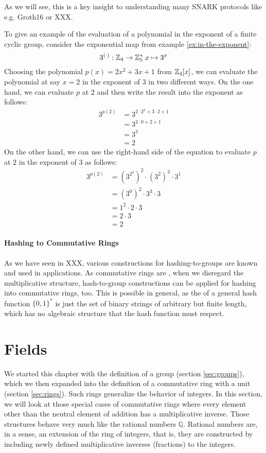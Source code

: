 As we will see, this is a key insight to understanding many SNARK protocols like e.g. Groth16 \citep{Groth16} or XXX.
\begin{example} To give an example of the evaluation of a polynomial in the exponent of a finite cyclic group, consider the exponential map from example \ref{ex:in-the-exponent}:
$$
3^{(\cdot)}: \mathbb{Z}_4 \to \mathbb{Z}_5^* \; x \mapsto 3^x
$$
 Choosing the polynomial $p(x)= 2x^2 +3x +1$ from $\mathbb{Z}_4[x]$, we can evaluate the polynomial at say $x=2$ in the exponent of $3$ in two different ways. On the one hand, we can evaluate $p$ at $2$ and then write the result into the exponent as follows:
\begin{align*}
3^{p(2)} &=3^{2\cdot 2^2+3\cdot 2 +1}\\
          & = 3^{2\cdot 0 +2 +1}\\
          & = 3^{3}\\
          & = 2
\end{align*}
On the other hand, we can use the right-hand side of the equation to evaluate $p$ at $2$ in the exponent of $3$ as follows:
\begin{align*}
3^{p(2)} &= \left(3^{2^2}\right)^2 \cdot \left(3^{2}\right)^3\cdot 3^1\\
         &= \left(3^{0}\right)^2 \cdot 3^3\cdot 3\\
         &= 1^2 \cdot 2 \cdot 3\\
         &= 2 \cdot 3\\
         &= 2
\end{align*}
\end{example}
\paragraph{Hashing to Commutative Rings} As we have seen in XXX, various constructions for hashing-to-groups are known and used in applications. As commutative rings are , when we disregard the multiplicative structure, hash-to-group constructions can be applied for hashing into commutative rings, too. This is possible in general, as the  of a general hash function $\{0,1\}^*$ is just the set of binary strings of arbitrary but finite length, which has no algebraic structure that the hash function must respect.

\section{Fields}\label{sec:fields}
We started this chapter with the definition of a group (section \ref{sec:groups}), which we then expanded into the definition of a commutative ring with a unit (section \ref{sec:rings}). Such rings generalize the behavior of integers. In this section, we will look at those special cases of commutative rings where every element other than the neutral element of addition has a multiplicative inverse. Those structures behave very much like the rational numbers $\mathbb{Q}$. Rational numbers are, in a sense, an extension of the ring of integers, that is, they are constructed by including newly defined multiplicative inverses (fractions) to the integers.

